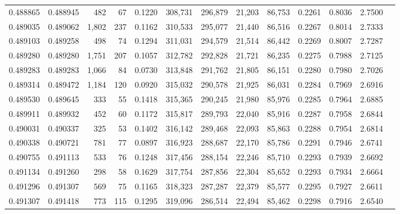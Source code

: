 \begin{tabular}{rrrrrrrrrrrrr}
0.488865 & 0.488945 &   482 &    67 &                                     0.1220 & 308,731 & 296,879 &  21,203 &  86,753 & 0.2261 & 0.8036 & 2.7500 \\
0.489035 & 0.489062 & 1,802 &   237 &                                     0.1162 & 310,533 & 295,077 &  21,440 &  86,516 & 0.2267 & 0.8014 & 2.7333 \\
0.489103 & 0.489258 &   498 &    74 &                                     0.1294 & 311,031 & 294,579 &  21,514 &  86,442 & 0.2269 & 0.8007 & 2.7287 \\
0.489280 & 0.489280 & 1,751 &   207 &                                     0.1057 & 312,782 & 292,828 &  21,721 &  86,235 & 0.2275 & 0.7988 & 2.7125 \\
0.489283 & 0.489283 & 1,066 &    84 &                                     0.0730 & 313,848 & 291,762 &  21,805 &  86,151 & 0.2280 & 0.7980 & 2.7026 \\
0.489314 & 0.489472 & 1,184 &   120 &                                     0.0920 & 315,032 & 290,578 &  21,925 &  86,031 & 0.2284 & 0.7969 & 2.6916 \\
0.489530 & 0.489645 &   333 &    55 &                                     0.1418 & 315,365 & 290,245 &  21,980 &  85,976 & 0.2285 & 0.7964 & 2.6885 \\
0.489911 & 0.489932 &   452 &    60 &                                     0.1172 & 315,817 & 289,793 &  22,040 &  85,916 & 0.2287 & 0.7958 & 2.6844 \\
0.490031 & 0.490337 &   325 &    53 &                                     0.1402 & 316,142 & 289,468 &  22,093 &  85,863 & 0.2288 & 0.7954 & 2.6814 \\
0.490338 & 0.490721 &   781 &    77 &                                     0.0897 & 316,923 & 288,687 &  22,170 &  85,786 & 0.2291 & 0.7946 & 2.6741 \\
0.490755 & 0.491113 &   533 &    76 &                                     0.1248 & 317,456 & 288,154 &  22,246 &  85,710 & 0.2293 & 0.7939 & 2.6692 \\
0.491134 & 0.491260 &   298 &    58 &                                     0.1629 & 317,754 & 287,856 &  22,304 &  85,652 & 0.2293 & 0.7934 & 2.6664 \\
0.491296 & 0.491307 &   569 &    75 &                                     0.1165 & 318,323 & 287,287 &  22,379 &  85,577 & 0.2295 & 0.7927 & 2.6611 \\
0.491307 & 0.491418 &   773 &   115 &                                     0.1295 & 319,096 & 286,514 &  22,494 &  85,462 & 0.2298 & 0.7916 & 2.6540 \\

\end{tabular}
